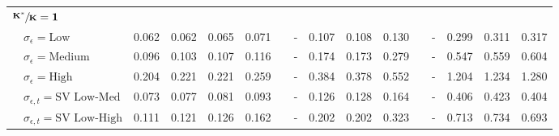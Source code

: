 \begin{table}[!tbp]
\begin{center}
\begin{tabular}{lllllcllllcllll}
\hline
{\bfseries $\mathbf{\sfrac{K^*}{K}=1}$}&&&&&&&&&&&&&&\tabularnewline
~~$\sigma_{\epsilon} =\text{Low}$& 0.062& 0.062& 0.065& 0.071&&-& 0.107& 0.108& 0.130&&-& 0.299& 0.311& 0.317\tabularnewline
~~$\sigma_{\epsilon} =\text{Medium}$& 0.096& 0.103& 0.107& 0.116&&-& 0.174& 0.173& 0.279&&-& 0.547& 0.559& 0.604\tabularnewline
~~$\sigma_{\epsilon} =\text{High}$& 0.204& 0.221& 0.221& 0.259&&-& 0.384& 0.378& 0.552&&-& 1.204& 1.234& 1.280\tabularnewline
~~$\sigma_{\epsilon,t} = \text{SV Low-Med}$& 0.073& 0.077& 0.081& 0.093&&-& 0.126& 0.128& 0.164&&-& 0.406& 0.423& 0.404\tabularnewline
~~$\sigma_{\epsilon,t}  = \text{SV Low-High}$& 0.111& 0.121& 0.126& 0.162&&-& 0.202& 0.202& 0.323&&-& 0.713& 0.734& 0.693\tabularnewline
\hline
\end{tabular}\end{center}
\end{table}
